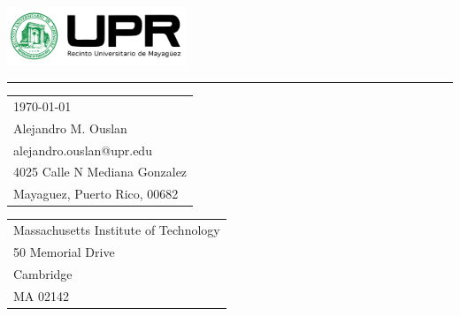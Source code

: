 \documentclass{article}
\begin{document}

\begingroup
\setlength{\topskip}{0pt}%
\setlength{\parskip}{0pt}%
\setlength{\parindent}{0pt}%
\vspace*{-1.5cm} %

\includegraphics[width=0.4\textwidth]{../assets/logo.png} %

\vspace{-1em} %

\rule{\linewidth}{1pt} %
\endgroup

\bigskip\bigskip %


\hfill
\begin{tabular}{l @{}}
\hfill \today \bigskip\\ %
\hfill Alejandro M. Ouslan \\
\hfill alejandro.ouslan@upr.edu \\
\hfill 4025 Calle N Mediana Gonzalez\\
\hfill Mayaguez, Puerto Rico, 00682 \\
\end{tabular}

\bigskip %


\begin{tabular}{@{} l}
Massachusetts Institute of Technology \\
50 Memorial Drive \\
Cambridge \\
MA 02142 \\
\end{tabular}
\end{document}
